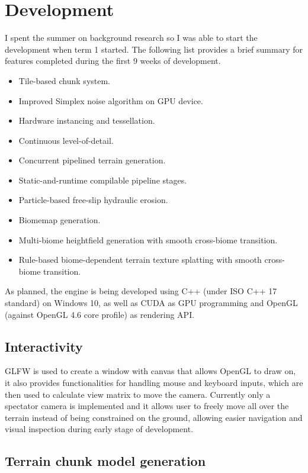 \documentclass[oneside, a4paper]{article}
\begin{document}
    \section{Development}
    I spent the summer on background research so I was able to start the development when term 1 started. The following list provides a brief summary for features completed during the first 9 weeks of development.

    \begin{itemize}[label=\(\diamond\)]
        \item Tile-based chunk system.
        \item Improved Simplex noise algorithm on GPU device.
        \item Hardware instancing and tessellation.
        \item Continuous level-of-detail.
        \item Concurrent pipelined terrain generation.
        \item Static-and-runtime compilable pipeline stages.
        \item Particle-based free-slip hydraulic erosion.
        \item Biomemap generation.
        \item Multi-biome heightfield generation with smooth cross-biome transition.
        \item Rule-based biome-dependent terrain texture splatting with smooth cross-biome transition.
    \end{itemize}

    As planned, the engine is being developed using C++ (under ISO C++ 17 standard) on Windows 10, as well as CUDA as GPU programming and OpenGL (against OpenGL 4.6 core profile) as rendering API.

    \subsection{Interactivity}

    GLFW \cite{glfw} is used to create a window with canvas that allows OpenGL to draw on, it also provides functionalities for handling mouse and keyboard inputs, which are then used to calculate view matrix to move the camera. Currently only a spectator camera is implemented and it allows user to freely move all over the terrain instead of being constrained on the ground, allowing easier navigation and visual inspection during early stage of development.

    \subsection{Terrain chunk model generation}
\end{document}
